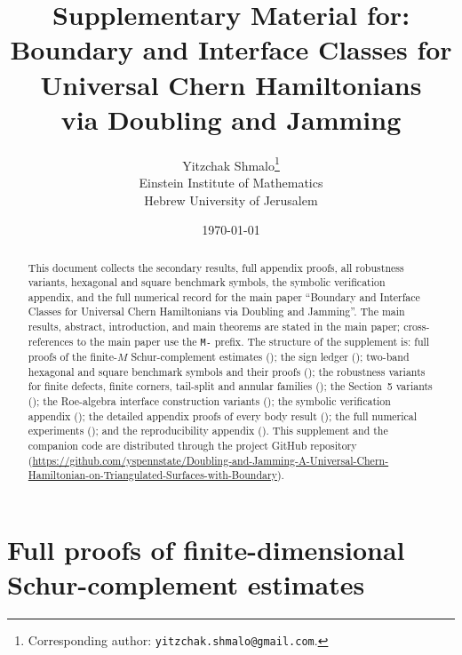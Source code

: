 \documentclass[11pt]{article}
\title{Supplementary Material for: Boundary and Interface Classes for Universal Chern Hamiltonians\\
via Doubling and Jamming}
\author{
Yitzchak Shmalo\thanks{Corresponding author: \texttt{yitzchak.shmalo@gmail.com}.}\\[0.6em]
Einstein Institute of Mathematics\\
Hebrew University of Jerusalem
}
\date{\today}
\numberwithin{equation}{section}
\theoremstyle{definition}
\theoremstyle{remark}
\begin{document}
\maketitle

\begin{abstract}
This document collects the secondary results, full appendix proofs, all robustness variants,
hexagonal and square benchmark symbols, the symbolic verification appendix, and the full numerical
record for the main paper ``Boundary and Interface Classes for Universal Chern Hamiltonians via
Doubling and Jamming''. The main results, abstract, introduction, and main theorems are stated
in the main paper; cross-references to the main paper use the \texttt{M-} prefix. The structure of
the supplement is: full proofs of the finite-\(M\) Schur-complement estimates
(); the sign ledger (); two-band hexagonal and square
benchmark symbols and their proofs (); the robustness variants for
finite defects, finite corners, tail-split and annular families
();
the Section~5 variants (); the Roe-algebra interface construction
variants (); the symbolic verification appendix
(); the detailed appendix proofs of every body result
(); the full numerical experiments
(); and the reproducibility appendix
(). This supplement and the
companion code are distributed through the project GitHub repository
(\url{https://github.com/yspennstate/Doubling-and-Jamming-A-Universal-Chern-Hamiltonian-on-Triangulated-Surfaces-with-Boundary}).
\end{abstract}


\section{Full proofs of finite-dimensional Schur-complement estimates}\label{sec:schur_proofs}
\end{document}
